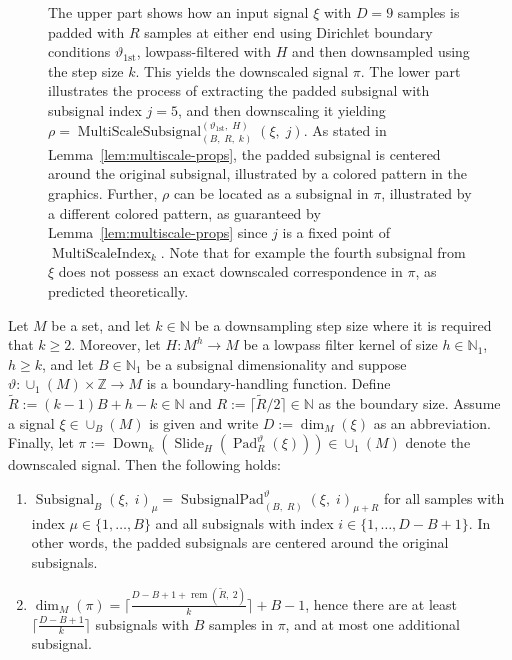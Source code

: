 \documentclass[journal]{IEEEtran}
\newcommand{\N}{\mathbb{N}}
\newcommand{\Z}{\mathbb{Z}}
\newcommand{\ROI}{B}
\newcommand{\discint}[2]{\{#1,\dotsc,#2\}}
\newcommand{\inint}[2]{\in\discint{#1}{#2}}
\newcommand{\bceil}[1]{\big\lceil #1 \big\rceil}
\DeclareMathOperator{\Subsignal}{Subsignal}
\DeclareMathOperator{\Slide}{Slide}
\newcommand{\rem}[2]{\operatorname{rem}(#1,\ #2)}
\DeclareMathOperator{\Downsampling}{Down}
\DeclareMathOperator{\Padding}{Pad}
\newcommand{\PaddingParams}{\Padding_R^\vartheta}
\DeclareMathOperator{\SubsignalPad}{SubsignalPad}
\newcommand{\SubsignalPadROIParams}{\SubsignalPad_{(\ROI,\; R)}^{\vartheta}}
\DeclareMathOperator{\MultiScaleSubsignal}{MultiScaleSubsignal}
\DeclareMathOperator{\MultiScaleIndex}{MultiScaleIndex}
\newcommand{\Dirichlet}{1\text{st}}
\begin{document}
\begin{figure}[p]
{    The upper part shows how an input signal $\xi$ with $D = 9$ samples is padded with $R$ samples at either end using Dirichlet boundary conditions $\vartheta_{\Dirichlet}$, lowpass-filtered with $H$ and then downsampled using the step size $k$.
    This yields the downscaled signal $\pi$.
    The lower part illustrates the process of extracting the padded subsignal with subsignal index $j = 5$, and then downscaling it yielding $\rho = \MultiScaleSubsignal_{(\ROI,\; R,\; k)}^{(\vartheta_{\Dirichlet},\; H)}(\xi,\;j)$.
    As stated in Lemma~\ref{lem:multiscale-props}, the padded subsignal is centered around the original subsignal, illustrated by a colored pattern in the graphics.
    Further, $\rho$ can be located as a subsignal in $\pi$, illustrated by a different colored pattern, as guaranteed by Lemma~\ref{lem:multiscale-props} since $j$ is a fixed point of $\MultiScaleIndex_k$.
    Note that for example the fourth subsignal from $\xi$ does not possess an exact downscaled correspondence in $\pi$, as predicted theoretically.}
  \label{fig:multiscale-xp}
\end{figure}\begin{lemma}
\label{lem:multiscale-props}
Let $M$ be a set, and let $k\in\N$ be a downsampling step size where it is required that $k \geq 2$.
Moreover, let $H\colon M^h\to M$ be a lowpass filter kernel of size $h\in\N_1$, $h \geq k$, and let $\ROI\in\N_1$ be a subsignal dimensionality and suppose $\vartheta\colon\cup_1(M)\times\Z\to M$ is a boundary-handling function.
Define $\tilde{R} := (k - 1)\ROI + h - k\in\N$ and $R := \bceil{\tilde{R} / 2}\in\N$ as the boundary size.
Assume a signal $\xi\in\cup_\ROI(M)$ is given and write $D := \dim_M(\xi)$ as an abbreviation.
Finally, let $\pi := \Downsampling_k(\Slide_H(\PaddingParams(\xi)))\in\cup_1(M)$ denote the downscaled signal.
Then the following holds:
\begin{enumerate}\setlength{\itemsep}{.5ex}
  \item \label{lem:multiscale-props-a} $\Subsignal_\ROI(\xi,\;i)_\mu = \SubsignalPadROIParams(\xi,\;i)_{\mu + R}$ for all samples with index $\mu\inint{1}{\ROI}$ and all subsignals with index $i\inint{1}{D - \ROI + 1}$.
    In other words, the padded subsignals are centered around the original subsignals.
  \item \label{lem:multiscale-props-b} $\dim_M(\pi) = \bceil{\frac{D - \ROI + 1 + \rem{\tilde{R}}{2}}{k}} + \ROI - 1$, hence there are at least $\bceil{\frac{D - \ROI + 1}{k}}$ subsignals with $\ROI$ samples in $\pi$, and at most one additional subsignal.

\end{enumerate}
\end{lemma}
\end{document}
